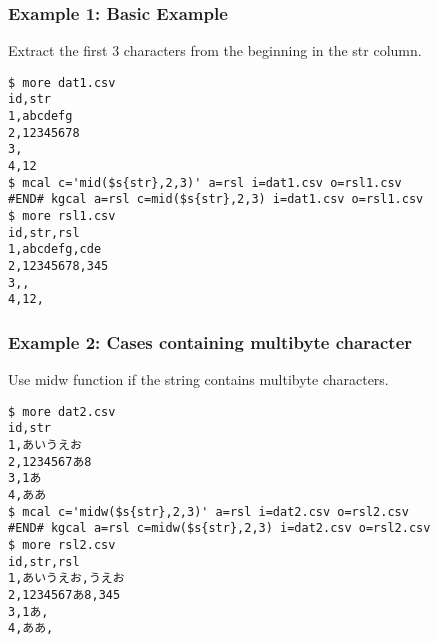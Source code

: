 \subsubsection*{Example 1: Basic Example}

Extract the first 3 characters from the beginning in the str column.


\begin{Verbatim}[baselinestretch=0.7,frame=single]
$ more dat1.csv
id,str
1,abcdefg
2,12345678
3,
4,12
$ mcal c='mid($s{str},2,3)' a=rsl i=dat1.csv o=rsl1.csv
#END# kgcal a=rsl c=mid($s{str},2,3) i=dat1.csv o=rsl1.csv
$ more rsl1.csv
id,str,rsl
1,abcdefg,cde
2,12345678,345
3,,
4,12,
\end{Verbatim}
\subsubsection*{Example 2: Cases containing multibyte character}

Use midw function if the string contains multibyte characters.


\begin{Verbatim}[baselinestretch=0.7,frame=single]
$ more dat2.csv
id,str
1,あいうえお
2,1234567あ8
3,1あ
4,ああ
$ mcal c='midw($s{str},2,3)' a=rsl i=dat2.csv o=rsl2.csv
#END# kgcal a=rsl c=midw($s{str},2,3) i=dat2.csv o=rsl2.csv
$ more rsl2.csv
id,str,rsl
1,あいうえお,うえお
2,1234567あ8,345
3,1あ,
4,ああ,
\end{Verbatim}

